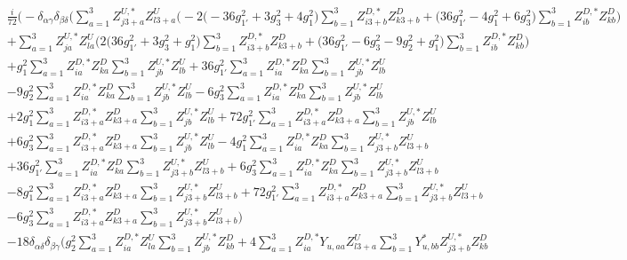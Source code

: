 \begin{align} 
 &\frac{i}{72} \Big(- \delta_{\alpha \gamma} \delta_{\beta \delta} \Big(\sum_{a=1}^{3}Z^{U,*}_{j 3 + a} Z_{{l 3 + a}}^{U}  \Big(-2 \Big(-36 g_{1'}^{2}  + 3 g_{3}^{2}  + 4 g_{1}^{2} \Big)\sum_{b=1}^{3}Z^{D,*}_{i 3 + b} Z_{{k 3 + b}}^{D}   + \Big(36 g_{1'}^{2}  -4 g_{1}^{2}  + 6 g_{3}^{2} \Big)\sum_{b=1}^{3}Z^{D,*}_{i b} Z_{{k b}}^{D}  \Big)\nonumber \\ 
 &+\sum_{a=1}^{3}Z^{U,*}_{j a} Z_{{l a}}^{U}  \Big(2 \Big(36 g_{1'}^{2}  + 3 g_{3}^{2}  + g_{1}^{2}\Big)\sum_{b=1}^{3}Z^{D,*}_{i 3 + b} Z_{{k 3 + b}}^{D}   + \Big(36 g_{1'}^{2}  -6 g_{3}^{2}  -9 g_{2}^{2}  + g_{1}^{2}\Big)\sum_{b=1}^{3}Z^{D,*}_{i b} Z_{{k b}}^{D}  \Big)\nonumber \\ 
 &+g_{1}^{2} \sum_{a=1}^{3}Z^{D,*}_{i a} Z_{{k a}}^{D}  \sum_{b=1}^{3}Z^{U,*}_{j b} Z_{{l b}}^{U}  +36 g_{1'}^{2} \sum_{a=1}^{3}Z^{D,*}_{i a} Z_{{k a}}^{D}  \sum_{b=1}^{3}Z^{U,*}_{j b} Z_{{l b}}^{U}  \nonumber \\ 
 &-9 g_{2}^{2} \sum_{a=1}^{3}Z^{D,*}_{i a} Z_{{k a}}^{D}  \sum_{b=1}^{3}Z^{U,*}_{j b} Z_{{l b}}^{U}  -6 g_{3}^{2} \sum_{a=1}^{3}Z^{D,*}_{i a} Z_{{k a}}^{D}  \sum_{b=1}^{3}Z^{U,*}_{j b} Z_{{l b}}^{U}  \nonumber \\ 
 &+2 g_{1}^{2} \sum_{a=1}^{3}Z^{D,*}_{i 3 + a} Z_{{k 3 + a}}^{D}  \sum_{b=1}^{3}Z^{U,*}_{j b} Z_{{l b}}^{U}  +72 g_{1'}^{2} \sum_{a=1}^{3}Z^{D,*}_{i 3 + a} Z_{{k 3 + a}}^{D}  \sum_{b=1}^{3}Z^{U,*}_{j b} Z_{{l b}}^{U}  \nonumber \\ 
 &+6 g_{3}^{2} \sum_{a=1}^{3}Z^{D,*}_{i 3 + a} Z_{{k 3 + a}}^{D}  \sum_{b=1}^{3}Z^{U,*}_{j b} Z_{{l b}}^{U}  -4 g_{1}^{2} \sum_{a=1}^{3}Z^{D,*}_{i a} Z_{{k a}}^{D}  \sum_{b=1}^{3}Z^{U,*}_{j 3 + b} Z_{{l 3 + b}}^{U}  \nonumber \\ 
 &+36 g_{1'}^{2} \sum_{a=1}^{3}Z^{D,*}_{i a} Z_{{k a}}^{D}  \sum_{b=1}^{3}Z^{U,*}_{j 3 + b} Z_{{l 3 + b}}^{U}  +6 g_{3}^{2} \sum_{a=1}^{3}Z^{D,*}_{i a} Z_{{k a}}^{D}  \sum_{b=1}^{3}Z^{U,*}_{j 3 + b} Z_{{l 3 + b}}^{U}  \nonumber \\ 
 &-8 g_{1}^{2} \sum_{a=1}^{3}Z^{D,*}_{i 3 + a} Z_{{k 3 + a}}^{D}  \sum_{b=1}^{3}Z^{U,*}_{j 3 + b} Z_{{l 3 + b}}^{U}  +72 g_{1'}^{2} \sum_{a=1}^{3}Z^{D,*}_{i 3 + a} Z_{{k 3 + a}}^{D}  \sum_{b=1}^{3}Z^{U,*}_{j 3 + b} Z_{{l 3 + b}}^{U}  \nonumber \\ 
 &-6 g_{3}^{2} \sum_{a=1}^{3}Z^{D,*}_{i 3 + a} Z_{{k 3 + a}}^{D}  \sum_{b=1}^{3}Z^{U,*}_{j 3 + b} Z_{{l 3 + b}}^{U}  \Big)\nonumber \\ 
 &-18 \delta_{\alpha \delta} \delta_{\beta \gamma} \Big(g_{2}^{2} \sum_{a=1}^{3}Z^{D,*}_{i a} Z_{{l a}}^{U}  \sum_{b=1}^{3}Z^{U,*}_{j b} Z_{{k b}}^{D}  +4 \sum_{a=1}^{3}Z^{D,*}_{i a} Y_{u,{a a}} Z_{{l 3 + a}}^{U}  \sum_{b=1}^{3}Y^*_{u,{b b}} Z^{U,*}_{j 3 + b} Z_{{k b}}^{D}  \nonumber \\ 

\end{align}
